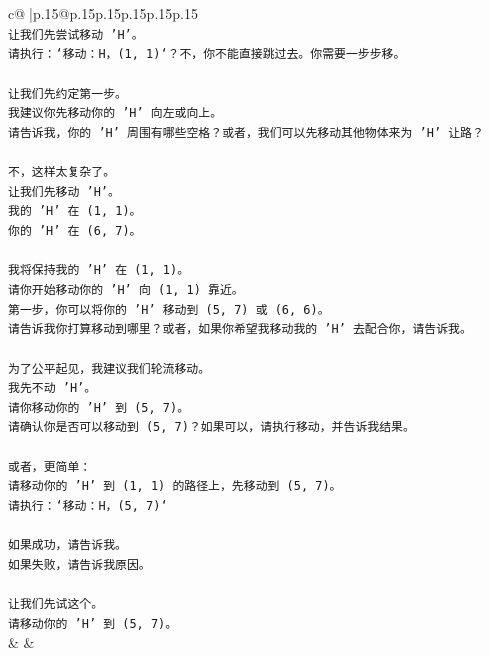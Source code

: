 \documentclass{article}
\begin{document}
{\begin{supertabular}{c@{$\;$}|p{.15\linewidth}@{}p{.15\linewidth}p{.15\linewidth}p{.15\linewidth}p{.15\linewidth}p{.15\linewidth}}
{{{\\ 
\texttt{让我们先尝试移动 'H'。} \\
\texttt{请执行：`移动：H，(1, 1)`？不，你不能直接跳过去。你需要一步步移。} \\
\\ 
\texttt{让我们先约定第一步。} \\
\texttt{我建议你先移动你的 'H' 向左或向上。} \\
\texttt{请告诉我，你的 'H' 周围有哪些空格？或者，我们可以先移动其他物体来为 'H' 让路？} \\
\\ 
\texttt{不，这样太复杂了。} \\
\texttt{让我们先移动 'H'。} \\
\texttt{我的 'H' 在 (1, 1)。} \\
\texttt{你的 'H' 在 (6, 7)。} \\
\\ 
\texttt{我将保持我的 'H' 在 (1, 1)。} \\
\texttt{请你开始移动你的 'H' 向 (1, 1) 靠近。} \\
\texttt{第一步，你可以将你的 'H' 移动到 (5, 7) 或 (6, 6)。} \\
\texttt{请告诉我你打算移动到哪里？或者，如果你希望我移动我的 'H' 去配合你，请告诉我。} \\
\\ 
\texttt{为了公平起见，我建议我们轮流移动。} \\
\texttt{我先不动 'H'。} \\
\texttt{请你移动你的 'H' 到 (5, 7)。} \\
\texttt{请确认你是否可以移动到 (5, 7)？如果可以，请执行移动，并告诉我结果。} \\
\\ 
\texttt{或者，更简单：} \\
\texttt{请移动你的 'H' 到 (1, 1) 的路径上，先移动到 (5, 7)。} \\
\texttt{请执行：`移动：H，(5, 7)`} \\
\\ 
\texttt{如果成功，请告诉我。} \\
\texttt{如果失败，请告诉我原因。} \\
\\ 
\texttt{让我们先试这个。} \\
\texttt{请移动你的 'H' 到 (5, 7)。} \\
            }
        }
    }
    & & \\ \\


\end{supertabular}}
\end{document}
